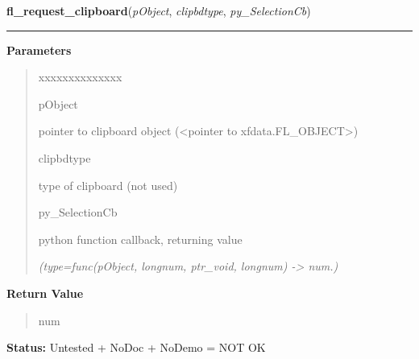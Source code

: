     \vspace{0.5ex}

\hspace{.8\funcindent}\begin{boxedminipage}{\funcwidth}

    \raggedright \textbf{fl\_request\_clipboard}(\textit{pObject}, \textit{clipbdtype}, \textit{py\_SelectionCb})

    \vspace{-1.5ex}

    \rule{\textwidth}{0.5\fboxrule}
\setlength{\parskip}{2ex}
\setlength{\parskip}{1ex}
      \textbf{Parameters}
      \vspace{-1ex}

      \begin{quote}
        \begin{Ventry}{xxxxxxxxxxxxxx}

          \item[pObject]

          pointer to clipboard object ({\textless}pointer to 
          xfdata.FL\_OBJECT{\textgreater})

          \item[clipbdtype]

          type of clipboard (not used)

          \item[py\_SelectionCb]

          python function callback, returning value

            {\it (type=func(pObject, longnum, ptr\_void, longnum) -{\textgreater} num.)}

        \end{Ventry}

      \end{quote}

      \textbf{Return Value}
    \vspace{-1ex}

      \begin{quote}
      num

      \end{quote}

\textbf{Status:} Untested + NoDoc + NoDemo = NOT OK



    \end{boxedminipage}

    \label{xformslib:library:fl_add_clock}

